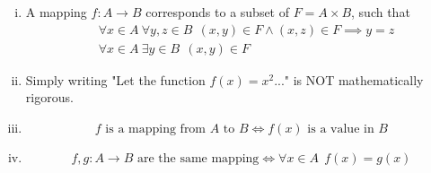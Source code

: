 \documentclass[../../script.tex]{subfiles}
\begin{document}
\begin{rem}\leavevmode
\begin{enumerate}[(i)]
	\item A mapping $f: A \rightarrow B$ corresponds to a subset of $F = A \times B$, such that
	\begin{align*}
		&\forall x \in A ~\forall y, z \in B ~~(x, y) \in F \wedge (x, z) \in F \implies y = z \\
		&\forall x \in A ~\exists y \in B ~~(x, y) \in F
	\end{align*}
	\item Simply writing "Let the function $f(x) = x^2$..." is NOT mathematically rigorous.
	\item 
	\[
		f \text{ is a mapping from } A \text{ to } B \iff f(x) \text{ is a value in } B
	\]
	\item 
	\[
		f, g: A \longrightarrow B \text{ are the same mapping} \iff \forall x \in A ~~f(x) = g(x)
	\]
\end{enumerate}
\end{rem}
\end{document}
